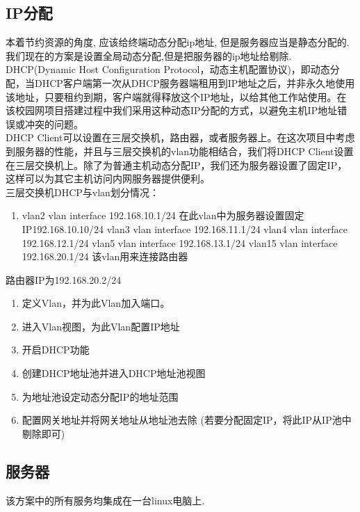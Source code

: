 \subsection{IP分配}%
本着节约资源的角度, 应该给终端动态分配ip地址, 但是服务器应当是静态分配的.我们现在的方案是设置全局动态分配,但是把服务器的ip地址给剔除.\\
\indent DHCP(Dynamic Host Configuration Protocol，动态主机配置协议)，即动态分配，当DHCP客户端第一次从DHCP服务器端租用到IP地址之后，并非永久地使用该地址，只要租约到期，客户端就得释放这个IP地址，以给其他工作站使用。在该校园网项目搭建过程中我们采用这种动态IP分配的方式，以避免主机IP地址错误或冲突的问题。
\\
\indent DHCP Client可以设置在三层交换机，路由器，或者服务器上。在这次项目中考虑到服务器的性能，并且与三层交换机的vlan功能相结合，我们将DHCP Client设置在三层交换机上。除了为普通主机动态分配IP，我们还为服务器设置了固定IP，这样可以为其它主机访问内网服务器提供便利。
\\
三层交换机DHCP与vlan划分情况：
\begin{enumerate}
\item vlan2
vlan interface 192.168.10.1/24
在此vlan中为服务器设置固定IP192.168.10.10/24
\indent vlan3
vlan interface 192.168.11.1/24
\indent vlan4
vlan interface 192.168.12.1/24
\indent vlan5
vlan interface 192.168.13.1/24
\indent vlan15
vlan interface 192.168.20.1/24
该vlan用来连接路由器
\end{enumerate}
路由器IP为192.168.20.2/24
\begin{enumerate}
\item 定义Vlan，并为此Vlan加入端口。
\item 进入Vlan视图，为此Vlan配置IP地址
\item 开启DHCP功能
\item 创建DHCP地址池并进入DHCP地址池视图
\item 为地址池设定动态分配IP的地址范围
\item 配置网关地址并将网关地址从地址池去除
(若要分配固定IP，将此IP从IP池中剔除即可)
\end{enumerate}
\subsection{服务器}%
	该方案中的所有服务均集成在一台linux电脑上.
